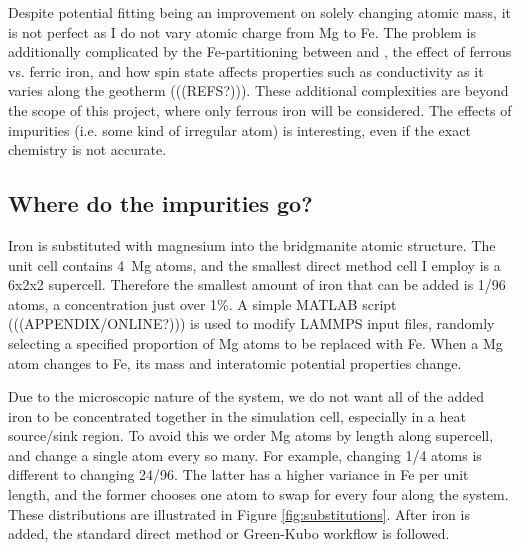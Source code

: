 Despite potential fitting being an improvement on solely changing atomic mass, it is not perfect as I do not vary atomic charge from Mg to Fe. The problem is additionally complicated by the Fe-partitioning between \mgsios and \mgo, the effect of ferrous vs. ferric iron, and how spin state affects properties such as conductivity as it varies along the geotherm (((REFS?))). These additional complexities are beyond the scope of this project, where only ferrous iron will be considered. The effects of impurities (i.e. some kind of irregular atom) is interesting, even if the exact chemistry is not accurate.



\subsection{Where do the impurities go?} 

Iron is substituted with magnesium into the bridgmanite atomic structure. The unit cell contains 4~Mg atoms, and the smallest direct method cell I employ is a 6x2x2 supercell. Therefore the smallest amount of iron that can be added is 1/96 atoms, a concentration just over 1\%. A simple MATLAB script (((APPENDIX/ONLINE?))) is used to modify LAMMPS input files, randomly selecting a specified proportion of Mg atoms to be replaced with Fe. When a Mg atom changes to Fe, its mass and interatomic potential properties change. 

Due to the microscopic nature of the system, we do not want all of the added iron to be concentrated together in the simulation cell, especially in a heat source/sink region. To avoid this we order Mg atoms by length along supercell, and change a single atom every so many. For example, changing 1/4 atoms is different to changing 24/96. The latter has a higher variance in Fe per unit length, and the former chooses one atom to swap for every four along the system. These distributions are illustrated in Figure \ref{fig:substitutions}. After iron is added, the standard direct method or Green-Kubo workflow is followed.

